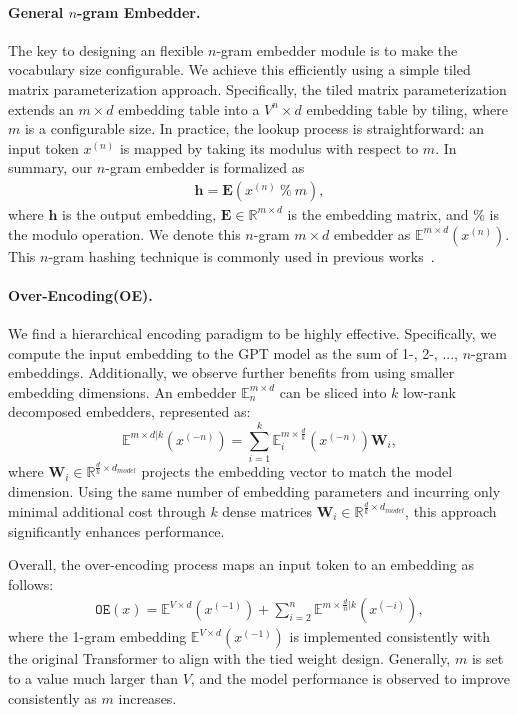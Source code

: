 \paragraph{General $n$-gram Embedder.} The key to designing an flexible $n$-gram embedder module is to make the vocabulary size configurable. We achieve this efficiently using a simple tiled matrix parameterization approach. Specifically, the tiled matrix parameterization extends an $m \times d$ embedding table into a $V^n \times d$ embedding table by tiling, where $m$ is a configurable size. In practice, the lookup process is straightforward: an input token $x^{(n)}$ is mapped by taking its modulus with respect to $m$. In summary, our $n$-gram embedder is formalized as
\begin{align}
    \mathbf{h}=\mathbf{E}\left(x^{(n)}\ \%\ m\right),
\end{align}
where $\mathbf{h}$ is the output embedding, $\mathbf{E} \in \mathbb{R}^{m \times d}$ is the embedding matrix, and $\%$ is the modulo operation. We denote this $n$-gram $m \times d$ embedder as $\mathbb{E}^{m \times d}(x^{(n)})$. This $n$-gram hashing technique is commonly used in previous works~\cite{huang21f_interspeech, roy2022ngrammeraugmentingtransformerslatent}.



\paragraph{Over-Encoding(OE).} We find a hierarchical encoding paradigm to be highly effective. Specifically, we compute the input embedding to the GPT model as the sum of 1-, 2-, ..., $n$-gram embeddings. Additionally, we observe further benefits from using smaller embedding dimensions. An embedder $\mathbb{E}^{m \times d}_n$ can be sliced into $k$ low-rank decomposed embedders, represented as:
\begin{equation}
    \mathbb{E}^{m\times d|k}(x^{(-n)}) = \sum_{i=1}^k\mathbb{E}^{m\times \frac{d}{k}}_i(x^{(-n)})\mathbf{W}_i,
\end{equation}
where $\mathbf{W}_i \in \mathbb{R}^{\frac{d}{k} \times d_{model}}$ projects the embedding vector to match the model dimension. Using the same number of embedding parameters and incurring only minimal additional cost through $k$ dense matrices $\mathbf{W}_i \in \mathbb{R}^{\frac{d}{k} \times d_{model}}$, this approach significantly enhances performance. 

Overall, the over-encoding process maps an input token to an embedding as follows:
\begin{align}
    \texttt{OE}(x)= \mathbb{E}^{V\times d}(x^{(-1)}) +\sum_{i=2}^{n} \mathbb{E}^{m\times \frac{d}{n}|k}(x^{(-i)}), \label{eq:oe_standard}
\end{align}
where the 1-gram embedding $\mathbb{E}^{V \times d}(x^{(-1)})$ is implemented consistently with the original Transformer to align with the tied weight design. Generally, $m$ is set to a value much larger than $V$, and the model performance is observed to improve consistently as $m$ increases. 

